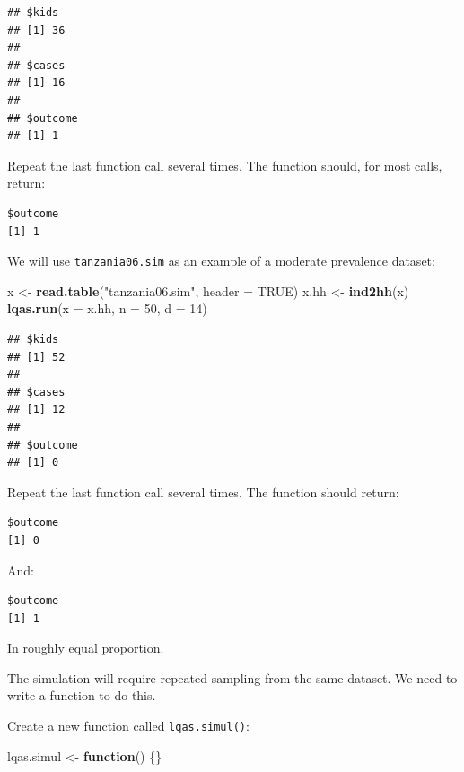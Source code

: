 \documentclass[12pt,a4paper]{book}
\newenvironment{Shaded}{\begin{snugshade}}{\end{snugshade}}
\newcommand{\KeywordTok}[1]{\textcolor[rgb]{0.13,0.29,0.53}{\textbf{#1}}}
\newcommand{\DataTypeTok}[1]{\textcolor[rgb]{0.13,0.29,0.53}{#1}}
\newcommand{\DecValTok}[1]{\textcolor[rgb]{0.00,0.00,0.81}{#1}}
\newcommand{\StringTok}[1]{\textcolor[rgb]{0.31,0.60,0.02}{#1}}
\newcommand{\OtherTok}[1]{\textcolor[rgb]{0.56,0.35,0.01}{#1}}
\newcommand{\ControlFlowTok}[1]{\textcolor[rgb]{0.13,0.29,0.53}{\textbf{#1}}}
\newcommand{\NormalTok}[1]{#1}
\theoremstyle{definition}
\theoremstyle{definition}
\theoremstyle{definition}
\theoremstyle{remark}
\begin{document}
\begin{verbatim}
## $kids
## [1] 36
## 
## $cases
## [1] 16
## 
## $outcome
## [1] 1
\end{verbatim}

Repeat the last function call several times. The function should, for
most calls, return:

\begin{verbatim}
$outcome
[1] 1
\end{verbatim}

We will use \texttt{tanzania06.sim} as an example of a moderate
prevalence dataset:

\begin{Shaded}
\begin{Highlighting}[]
\NormalTok{x <-}\StringTok{ }\KeywordTok{read.table}\NormalTok{(}\StringTok{"tanzania06.sim"}\NormalTok{, }\DataTypeTok{header =} \OtherTok{TRUE}\NormalTok{)}
\NormalTok{x.hh <-}\StringTok{ }\KeywordTok{ind2hh}\NormalTok{(x)}
\KeywordTok{lqas.run}\NormalTok{(}\DataTypeTok{x =}\NormalTok{ x.hh, }\DataTypeTok{n =} \DecValTok{50}\NormalTok{, }\DataTypeTok{d =} \DecValTok{14}\NormalTok{)}
\end{Highlighting}
\end{Shaded}

\begin{verbatim}
## $kids
## [1] 52
## 
## $cases
## [1] 12
## 
## $outcome
## [1] 0
\end{verbatim}

Repeat the last function call several times. The function should return:

\begin{verbatim}
$outcome
[1] 0
\end{verbatim}

And:

\begin{verbatim}
$outcome
[1] 1
\end{verbatim}

In roughly equal proportion.

The simulation will require repeated sampling from the same dataset. We
need to write a function to do this.

Create a new function called \texttt{lqas.simul()}:

\begin{Shaded}
\begin{Highlighting}[]
\NormalTok{lqas.simul <-}\StringTok{ }\ControlFlowTok{function}\NormalTok{() \{\}}
\end{Highlighting}
\end{Shaded}
\end{document}
